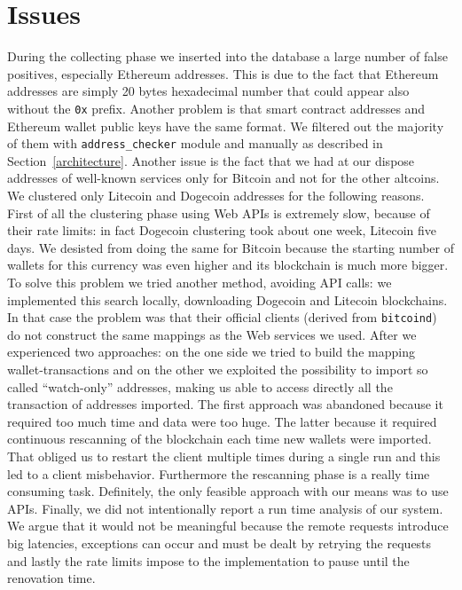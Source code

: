 \section{Issues} \label{sec:issues}
During the collecting phase we inserted into the database a large number of
false positives, especially Ethereum addresses. This is due to the fact that
Ethereum addresses are simply 20 bytes hexadecimal number that could appear
also without the \texttt{0x} prefix. Another problem is that smart contract
addresses and Ethereum wallet public keys have the same format. We filtered out
the majority of them with \texttt{address\_checker} module and manually as
described in Section~\ref{architecture}.
Another issue is the fact that we had at our dispose addresses
of well-known services only for Bitcoin and not for the other altcoins.
We clustered only Litecoin and Dogecoin addresses for the following reasons.
First of all the clustering phase using Web APIs is extremely slow, because of
their rate limits: in fact Dogecoin clustering took about one week, Litecoin
five days.
We desisted from doing the same for Bitcoin because the starting number of
wallets for this currency was even higher and its blockchain is much more
bigger. To solve this problem we tried another method, avoiding API calls: we
implemented this search locally, downloading Dogecoin and Litecoin blockchains.
In that case the problem was that their official clients (derived from
\texttt{bitcoind}) do not construct the same mappings as the Web services we
used. After we experienced two approaches: on the one side we tried to build the
mapping wallet-transactions and on the other we exploited the possibility to
import so called ``watch-only'' addresses, making us able to access directly
all the transaction of addresses imported.
The first approach was abandoned because it required too much time and data
were too huge. The latter because it required continuous rescanning of the
blockchain each time new wallets were imported. That obliged us to restart the
client multiple times during a single run and this led to a client misbehavior.
Furthermore the rescanning phase is a really time consuming task.
Definitely, the only feasible approach with our means was to use APIs.
Finally, we did not intentionally report a run time analysis of our
system. We argue that it would not be meaningful because the remote requests
introduce big latencies, exceptions can occur and must be dealt by retrying 
the requests and lastly the rate limits impose to the implementation to pause
until the renovation time.